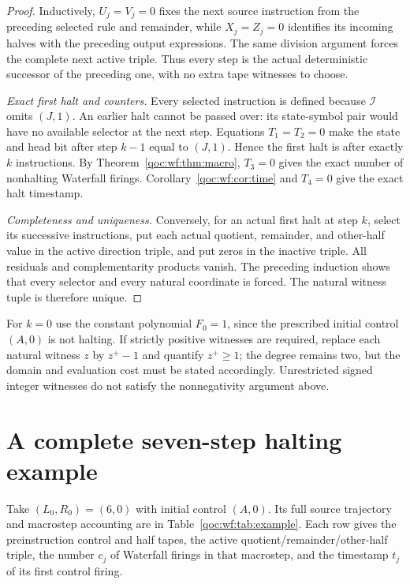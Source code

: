 \documentclass[11pt,letterpaper]{article}
\theoremstyle{definition}
\theoremstyle{remark}
\newcommand{\rulei}{\mathcal I}
\begin{document}
\begin{proof}
Inductively, $U_j=V_j=0$ fixes the next source instruction from the preceding selected rule and remainder, while $X_j=Z_j=0$ identifies its incoming halves with the preceding output expressions. The same division argument forces the complete next active triple. Thus every step is the actual deterministic successor of the preceding one, with no extra tape witnesses to choose.

\emph{Exact first halt and counters.}
Every selected instruction is defined because $\rulei$ omits $(J,1)$. An earlier halt cannot be passed over: its state-symbol pair would have no available selector at the next step. Equations $T_1=T_2=0$ make the state and head bit after step $k-1$ equal to $(J,1)$. Hence the first halt is after exactly $k$ instructions. By Theorem~\ref{qoc:wf:thm:macro}, $T_3=0$ gives the exact number of nonhalting Waterfall firings. Corollary~\ref{qoc:wf:cor:time} and $T_4=0$ give the exact halt timestamp.

\emph{Completeness and uniqueness.}
Conversely, for an actual first halt at step $k$, select its successive instructions, put each actual quotient, remainder, and other-half value in the active direction triple, and put zeros in the inactive triple. All residuals and complementarity products vanish. The preceding induction shows that every selector and every natural coordinate is forced. The natural witness tuple is therefore unique.
\end{proof}

For $k=0$ use the constant polynomial $F_0=1$, since the prescribed initial control $(A,0)$ is not halting. If strictly positive witnesses are required, replace each natural witness $z$ by $z^+-1$ and quantify $z^+\ge1$; the degree remains two, but the domain and evaluation cost must be stated accordingly. Unrestricted signed integer witnesses do not satisfy the nonnegativity argument above.

\section{A complete seven-step halting example}\label{qoc:wf:sec:example}
Take $(L_0,R_0)=(6,0)$ with initial control $(A,0)$. Its full source trajectory and macrostep accounting are in Table~\ref{qoc:wf:tab:example}. Each row gives the preinstruction control and half tapes, the active quotient/remainder/other-half triple, the number $c_j$ of Waterfall firings in that macrostep, and the timestamp $t_j$ of its first control firing.
\end{document}
